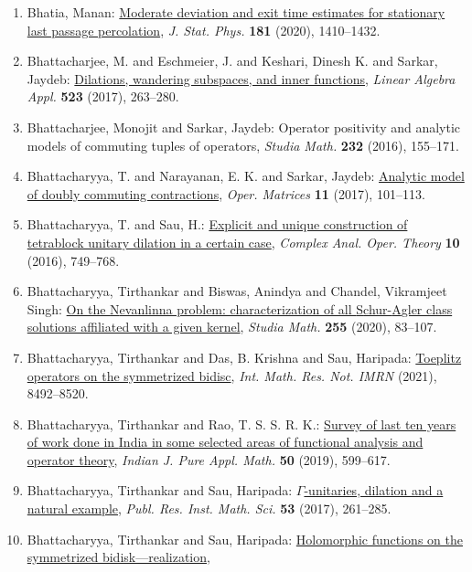 \begin{enumerate}
{applications}, \emph{Adv. Math.} {\bf 310} (2017), 377--425.
\item Bhatia, Manan: \href{https://doi.org/10.1007/s10955-020-02632-x}{Moderate deviation and exit time estimates for stationary last
passage percolation}, \emph{J. Stat. Phys.} {\bf 181} (2020), 1410--1432.
\item Bhattacharjee, M. and Eschmeier, J. and Keshari, Dinesh K. and
Sarkar, Jaydeb: \href{https://doi.org/10.1016/j.laa.2017.02.032}{Dilations, wandering subspaces, and inner functions}, \emph{Linear Algebra Appl.} {\bf 523} (2017), 263--280.
\item Bhattacharjee, Monojit and Sarkar, Jaydeb: Operator positivity and analytic models of commuting tuples of
operators, \emph{Studia Math.} {\bf 232} (2016), 155--171.
\item Bhattacharyya, T. and Narayanan, E. K. and Sarkar, Jaydeb: \href{https://doi.org/10.7153/oam-11-07}{Analytic model of doubly commuting contractions}, \emph{Oper. Matrices} {\bf 11} (2017), 101--113.
\item Bhattacharyya, T. and Sau, H.: \href{https://doi.org/10.1007/s11785-015-0472-9}{Explicit and unique construction of tetrablock unitary
dilation in a certain case}, \emph{Complex Anal. Oper. Theory} {\bf 10} (2016), 749--768.
\item Bhattacharyya, Tirthankar and Biswas, Anindya and Chandel,
Vikramjeet Singh: \href{https://doi.org/10.4064/sm190505-8-10}{On the {N}evanlinna problem: characterization of all
{S}chur-{A}gler class solutions affiliated with a given
kernel}, \emph{Studia Math.} {\bf 255} (2020), 83--107.
\item Bhattacharyya, Tirthankar and Das, B. Krishna and Sau,
Haripada: \href{https://doi.org/10.1093/imrn/rnz333}{Toeplitz operators on the symmetrized bidisc}, \emph{Int. Math. Res. Not. IMRN} {\bf } (2021), 8492--8520.
\item Bhattacharyya, Tirthankar and Rao, T. S. S. R. K.: \href{https://doi.org/10.1007/s13226-019-0345-4}{Survey of last ten years of work done in {I}ndia in some
selected areas of functional analysis and operator theory}, \emph{Indian J. Pure Appl. Math.} {\bf 50} (2019), 599--617.
\item Bhattacharyya, Tirthankar and Sau, Haripada: \href{https://doi.org/10.4171/PRIMS/53-2-2}{{$\Gamma$}-unitaries, dilation and a natural example}, \emph{Publ. Res. Inst. Math. Sci.} {\bf 53} (2017), 261--285.
\item Bhattacharyya, Tirthankar and Sau, Haripada: \href{https://doi.org/10.1016/j.jfa.2017.09.013}{Holomorphic functions on the symmetrized bidisk---realization,
}
\end{enumerate}
